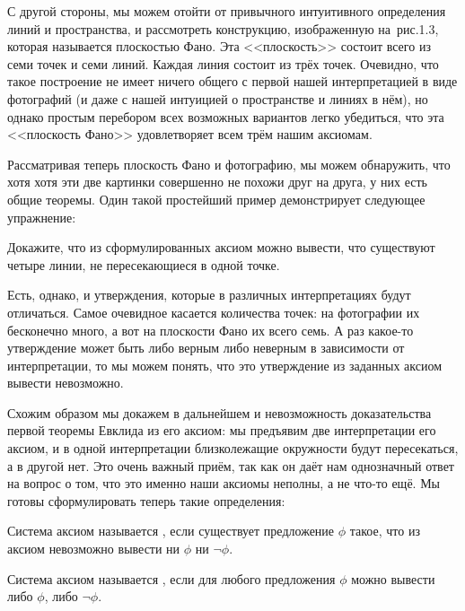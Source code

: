 С другой стороны, мы можем отойти от привычного интуитивного определения линий и пространства, и рассмотреть конструкцию, изображенную на~рис.1.3, которая называется плоскостью Фано. Эта <<плоскость>> состоит всего из семи точек и семи линий. Каждая линия состоит из трёх точек. Очевидно, что такое построение не имеет ничего общего с первой нашей интерпретацией в виде фотографий (и даже с нашей интуицией о пространстве и линиях в нём), но однако простым перебором всех возможных вариантов легко убедиться, что эта <<плоскость Фано>> удовлетворяет всем трём нашим аксиомам.

Рассматривая теперь плоскость Фано и фотографию, мы можем обнаружить, что хотя хотя эти две картинки совершенно не похожи друг на друга, у них есть общие теоремы. Один такой простейший пример демонстрирует следующее упражнение:

\begin{exercise}
Докажите, что из сформулированных аксиом можно вывести, что существуют четыре линии, не пересекающиеся в одной точке.
\end{exercise}

Есть, однако, и утверждения, которые в различных интерпретациях будут отличаться. Самое очевидное касается количества точек: на фотографии их бесконечно много, а вот на плоскости Фано их всего семь. А раз какое-то утверждение может быть либо верным либо неверным в зависимости от интерпретации, то мы можем понять, что это утверждение из заданных аксиом вывести невозможно.

Схожим образом мы докажем в дальнейшем и невозможность доказательства первой теоремы Евклида из его аксиом: мы предъявим две интерпретации его аксиом, и в одной интерпретации близколежащие окружности будут пересекаться, а в другой нет. Это очень важный приём, так как он даёт нам однозначный ответ на вопрос о том, что это именно наши аксиомы неполны, а не что-то ещё. Мы готовы сформулировать теперь такие определения:

\begin{definition}
Система аксиом называется , если существует предложение $\phi$ такое, что из аксиом невозможно вывести ни $\phi$ ни $\neg\phi$.
\end{definition}

\begin{definition}
Система аксиом называется , если для любого предложения $\phi$ можно вывести либо $\phi$, либо $\neg\phi$.
\end{definition}

